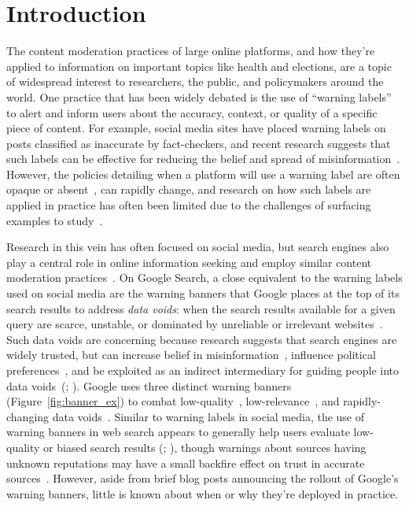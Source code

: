 
\section{Introduction}

The content moderation practices of large online platforms, and how they're applied to information on important topics like health and elections, are a topic of widespread interest to researchers, the public, and policymakers around the world. 
One practice that has been widely debated is the use of ``warning labels'' to alert and inform users about the accuracy, context, or quality of a specific piece of content.
For example, social media sites have placed warning labels on posts classified as inaccurate by fact-checkers, and recent research suggests that such labels can be effective for reducing the belief and spread of misinformation~\citep{martel2023misinformation}.
However, the policies detailing when a platform will use a warning label are often opaque or absent~\citep{krishnan2021research}, can rapidly change, and research on how such labels are applied in practice has often been limited due to the challenges of surfacing examples to study~\citep{bradshaw2023investigation}.

Research in this vein has often focused on social media, but search engines also play a central role in online information seeking and employ similar content moderation practices~\citep{urman2024user}.
On Google Search, a close equivalent to the warning labels used on social media are the warning banners that Google places at the top of its search results to address \textit{data voids}: when the search results available for a given query are scarce, unstable, or dominated by unreliable or irrelevant websites~\citep{golebiewski2019data}. 
Such data voids are concerning because research suggests that search engines are widely trusted, but can increase belief in misinformation~\citep{aslett2024online}, influence political preferences~\citep{epstein2015search}, and be exploited as an indirect intermediary for guiding people into data voids~(\cite{golebiewski2019data}; \cite{tripodi2022propagandists}).
Google uses three distinct warning banners (Figure~\ref{fig:banner_ex}) to combat low-quality~\citep{nayak2022new}, low-relevance~\citep{tucker2020getting}, and rapidly-changing data voids~\citep{sullivan2021new}.
Similar to warning labels in social media, the use of warning banners in web search appears to generally help users evaluate low-quality or biased search results (\cite{epstein2017suppressing}; \cite{ludolph2016manipulating}), though warnings about sources having unknown reputations may have a small backfire effect on trust in accurate sources~\citep{williams-ceci2024misinformation}.
However, aside from brief blog posts announcing the rollout of Google's warning banners, little is known about when or why they're deployed in practice. 

